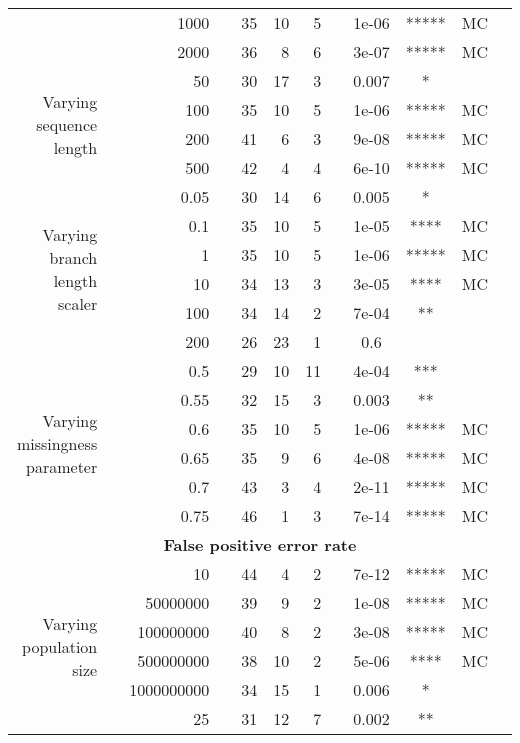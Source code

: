 \begin{table}[!h]
\begin{tabular}{r r r l r r r l c c c l}
   & & 1000 & & 35 & 10 & 5 & & 1e-06 & ***** & MC &  \\
   & & 2000 & & 36 & 8 & 6 & & 3e-07 & ***** & MC &  \\
\midrule
\multirow{ 4}{2cm}{Varying sequence length}
   & & 50 & & 30 & 17 & 3 & & 0.007 & * &  &  \\
   & & 100 & & 35 & 10 & 5 & & 1e-06 & ***** & MC &  \\
   & & 200 & & 41 & 6 & 3 & & 9e-08 & ***** & MC &  \\
   & & 500 & & 42 & 4 & 4 & & 6e-10 & ***** & MC &  \\
\midrule
\multirow{ 6}{2cm}{Varying branch length scaler}
   & & 0.05 & & 30 & 14 & 6 & & 0.005 & * &  &  \\
   & & 0.1 & & 35 & 10 & 5 & & 1e-05 & **** & MC &  \\
   & & 1 & & 35 & 10 & 5 & & 1e-06 & ***** & MC &  \\
   & & 10 & & 34 & 13 & 3 & & 3e-05 & **** & MC &  \\
   & & 100 & & 34 & 14 & 2 & & 7e-04 & ** &  &  \\
   & & 200 & & 26 & 23 & 1 & & 0.6 &  &  &  \\
\midrule
\multirow{ 6}{2cm}{Varying missingness parameter}
   & & 0.5 & & 29 & 10 & 11 & & 4e-04 & *** &  &  \\
   & & 0.55 & & 32 & 15 & 3 & & 0.003 & ** &  &  \\
   & & 0.6 & & 35 & 10 & 5 & & 1e-06 & ***** & MC &  \\
   & & 0.65 & & 35 & 9 & 6 & & 4e-08 & ***** & MC &  \\
   & & 0.7 & & 43 & 3 & 4 & & 2e-11 & ***** & MC &  \\
   & & 0.75 & & 46 & 1 & 3 & & 7e-14 & ***** & MC &  \\
\midrule
\multicolumn{12}{c}{\textbf{False positive error rate}} \\
\midrule
\multirow{ 6}{2cm}{Varying population size}
 & & 10 & & 44 & 4 & 2 & & 7e-12 & ***** & MC &  \\
   & & 50000000 & & 39 & 9 & 2 & & 1e-08 & ***** & MC &  \\
   & & 100000000 & & 40 & 8 & 2 & & 3e-08 & ***** & MC &  \\
   & & 500000000 & & 38 & 10 & 2 & & 5e-06 & **** & MC &  \\
   & & 1000000000 & & 34 & 15 & 1 & & 0.006 & * &  &  \\
\midrule
\multirow{ 6}{2cm}{Varying number of taxa}
   & & 25 & & 31 & 12 & 7 & & 0.002 & ** &  &  \\

\end{tabular}
\end{table}
